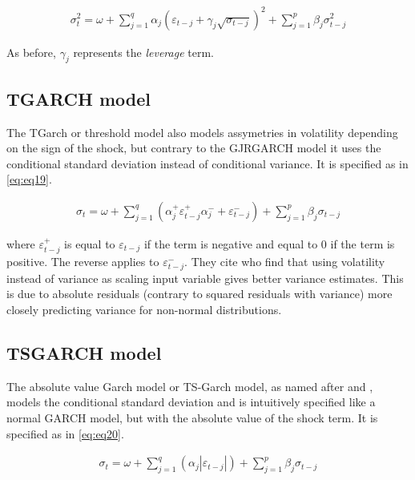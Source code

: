 \documentclass[a4paper, twoside]{templates/ociamthesis}
\begin{document}
\begin{align}
\sigma_t^2 = \omega + \sum\limits_{j=1}^q \alpha_j (\varepsilon_{t-j}+ \gamma_j \sqrt{\sigma_{t-j}})^2 + \sum\limits_{j = 1}^p \beta_j \sigma_{t-j}^2
 \label{eq:eq18}
\end{align}

As before, \(\gamma_j\) represents the \emph{leverage} term.

\hypertarget{tgarch-model}{%
\subsection{TGARCH model}\label{tgarch-model}}

\noindent The TGarch or threshold model \autocite{zakoian1994} also models assymetries in volatility depending on the sign of the shock, but contrary to the GJRGARCH model it uses the conditional standard deviation instead of conditional variance. It is specified as in \eqref{eq:eq19}.

\begin{align}
\sigma_t = \omega + \sum\limits_{j=1}^q (\alpha_j^+ \varepsilon_{t-j}^+ \alpha_j^{-} + \varepsilon_{t-j}^{-}) + \sum\limits_{j = 1}^p \beta_j \sigma_{t-j}
 \label{eq:eq19}
\end{align}

\noindent where \(\varepsilon_{t-j}^+\) is equal to \(\varepsilon_{t-j}\) if the term is negative and equal to 0 if the term is positive. The reverse applies to \(\varepsilon_{t-j}^-\). They cite \textcite{davidian1987} who find that using volatility instead of variance as scaling input variable gives better variance estimates. This is due to absolute residuals (contrary to squared residuals with variance) more closely predicting variance for non-normal distributions.

\hypertarget{tsgarch-model}{%
\subsection{TSGARCH model}\label{tsgarch-model}}

\noindent The absolute value Garch model or TS-Garch model, as named after \textcite{taylor1986} and \textcite{schwert1989}, models the conditional standard deviation and is intuitively specified like a normal GARCH model, but with the absolute value of the shock term. It is specified as in \eqref{eq:eq20}.

\begin{align}
\sigma_t = \omega + \sum\limits_{j=1}^q (\alpha_j \left|\varepsilon_{t-j}\right|) +
\sum\limits_{j = 1}^p \beta_j \sigma_{t-j}
 \label{eq:eq20}
\end{align}
\end{document}
